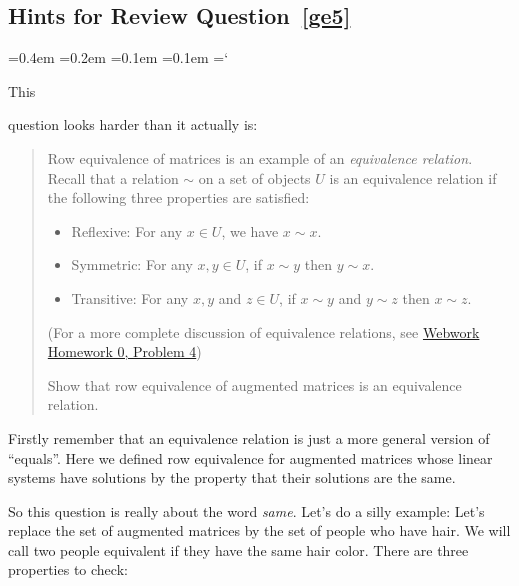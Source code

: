 
\subsection*{Hints for Review Question~\ref{ge5}}

{\ttfamily
{}\font=0.4em
\font=0.2em
\font=0.1em
\font=0.1em
\hyphenchar\font=`\-



\hypertarget{script_gaussian_elimination_hints}{This} question looks harder than it actually is:

\begin{quote}{\small
Row equivalence of matrices is an example of an \emph{equivalence relation}.  Recall that a relation $\sim$ on a set of objects $U$ is an equivalence relation if the following three properties are satisfied:
\begin{itemize}
\item Reflexive:  For any $x\in U$, we have $x\sim x$.
\item Symmetric:  For any $x,y \in U$, if $x\sim y$ then $y\sim x$.
\item Transitive: For any $x,y$ and $z \in U$, if $x\sim y$ and $y\sim z$ then $x\sim z$.
\end{itemize}

(For a more complete discussion of equivalence relations, see \href{\webworkurl Homework0-Background/4/}{Webwork Homework 0, Problem 4})

Show that row equivalence of augmented matrices is an equivalence relation.
}
\end{quote}

Firstly remember that an equivalence relation is just a more general version of ``equals''.
Here we defined row equivalence  for augmented matrices whose linear systems have
solutions by the property that their solutions are the same.

So this question is really about the word {\itshape same}. Let's do a silly example:
Let's replace the set of augmented matrices by the set of people who have hair.
We will call two people equivalent if they have the same hair color. There are three properties
to check:

}
